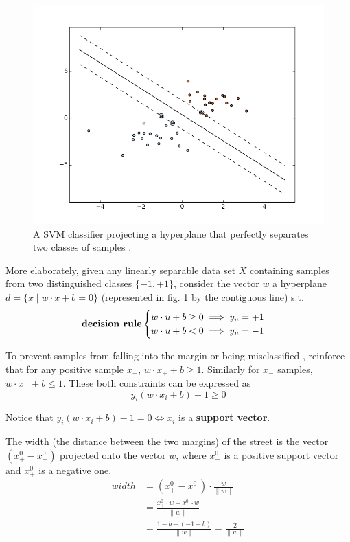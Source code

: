 \documentclass[12pt]{article}
\begin{document}
\begin{figure}[H]
	\centering
	\captionsetup{justification=centering}

	\includegraphics[scale=.5]{svm_margin}
	\caption{A SVM classifier projecting a hyperplane that perfectly separates two classes of samples \cite{sksvm}.}
	\label{fig:svmmargin}
\end{figure}

More elaborately, given any linearly separable data set $X$ containing samples from two distinguished classes $\{-1, +1\}$, consider the vector $w$ a hyperplane $d = \{x \mid w \cdot x + b = 0\}$ (represented in fig. \ref{fig:svmmargin} by the contiguous line) s.t.
$$\text{\textbf{decision rule}} \begin{cases}
	w \cdot u +b \geq 0 \implies y_u=+1\\
	w \cdot u +b < 0 \implies y_u=-1\\
\end{cases}$$

To prevent samples from falling into the margin or being misclassified \cite{wessvmdef}, reinforce that for any positive sample $x_+$, $w \cdot x_+ +b \geq 1$. Similarly for $x_-$ samples, $w \cdot x_- +b \leq 1$. These both constraints can be expressed as
\begin{equation} \label{svmconst}
y_i(w \cdot x_i +b) -1 \geq 0
\end{equation}

Notice that $y_i(w \cdot x_i +b) -1 = 0 \iff x_i $ is a \textbf{support vector}.

The width (the distance between the two margins) of the street is the vector $(x_+^0 -x_-^0)$ projected onto the vector $w$, where $x_-^0$ is a positive support vector and $x_+^0$ is a negative one.
\begin{equation} \label{eqsvmwidth}
\begin{split}
width & = (x_+^0 - x_-^0) \cdot \frac{w}{\|w\|} \\
      & =\frac{x_+^0 \cdot w - x_-^0 \cdot w}{\|w\|} \\
      & =\frac{1-b - (-1-b)}{\|w\|} = \frac{2}{\|w\|}
\end{split}
\end{equation}
\end{document}

